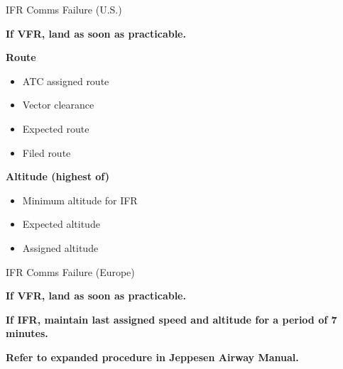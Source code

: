 \begin{checklist_emerg}{IFR Comms Failure (U.S.)}

    \begin{center}
        \textbf{If VFR, land as soon as practicable.}
    \end{center}

    \textbf{Route}
    \begin{itemize}[noitemsep]
        \item ATC assigned route
        \item Vector clearance
        \item Expected route
        \item Filed route
    \end{itemize}

    \textbf{Altitude (highest of)}
    \begin{itemize}[noitemsep]
        \item Minimum altitude for IFR
        \item Expected altitude
        \item Assigned altitude
    \end{itemize}
\end{checklist_emerg}

\begin{checklist_emerg}{IFR Comms Failure (Europe)}

    \begin{center}
        \textbf{If VFR, land as soon as practicable.}
    \end{center}

    \begin{center}
        \textbf{If IFR, maintain last assigned speed and altitude for a period of 7 minutes.}
    \end{center}

    \begin{center}
        \textbf{Refer to expanded procedure in Jeppesen Airway Manual.}
    \end{center}
\end{checklist_emerg}

\onecolumn
